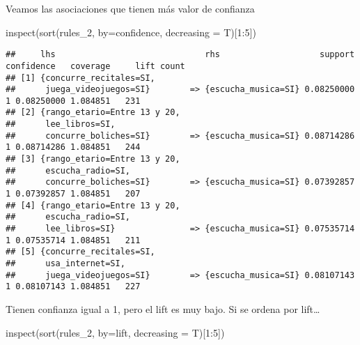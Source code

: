 \documentclass[
]{article}
\newenvironment{Shaded}{\begin{snugshade}}{\end{snugshade}}
\newcommand{\AttributeTok}[1]{\textcolor[rgb]{0.77,0.63,0.00}{#1}}
\newcommand{\DecValTok}[1]{\textcolor[rgb]{0.00,0.00,0.81}{#1}}
\newcommand{\FunctionTok}[1]{\textcolor[rgb]{0.00,0.00,0.00}{#1}}
\newcommand{\NormalTok}[1]{#1}
\newcommand{\SpecialCharTok}[1]{\textcolor[rgb]{0.00,0.00,0.00}{#1}}
\newcommand{\StringTok}[1]{\textcolor[rgb]{0.31,0.60,0.02}{#1}}
\begin{document}
Veamos las asociaciones que tienen más valor de confianza

\begin{Shaded}
\begin{Highlighting}[]
\FunctionTok{inspect}\NormalTok{(}\FunctionTok{sort}\NormalTok{(rules\_2, }\AttributeTok{by=}\StringTok{\textquotesingle{}confidence\textquotesingle{}}\NormalTok{, }\AttributeTok{decreasing =}\NormalTok{ T)[}\DecValTok{1}\SpecialCharTok{:}\DecValTok{5}\NormalTok{])}
\end{Highlighting}
\end{Shaded}

\begin{verbatim}
##     lhs                              rhs                    support confidence   coverage     lift count
## [1] {concurre_recitales=SI,                                                                             
##      juega_videojuegos=SI}        => {escucha_musica=SI} 0.08250000          1 0.08250000 1.084851   231
## [2] {rango_etario=Entre 13 y 20,                                                                        
##      lee_libros=SI,                                                                                     
##      concurre_boliches=SI}        => {escucha_musica=SI} 0.08714286          1 0.08714286 1.084851   244
## [3] {rango_etario=Entre 13 y 20,                                                                        
##      escucha_radio=SI,                                                                                  
##      concurre_boliches=SI}        => {escucha_musica=SI} 0.07392857          1 0.07392857 1.084851   207
## [4] {rango_etario=Entre 13 y 20,                                                                        
##      escucha_radio=SI,                                                                                  
##      lee_libros=SI}               => {escucha_musica=SI} 0.07535714          1 0.07535714 1.084851   211
## [5] {concurre_recitales=SI,                                                                             
##      usa_internet=SI,                                                                                   
##      juega_videojuegos=SI}        => {escucha_musica=SI} 0.08107143          1 0.08107143 1.084851   227
\end{verbatim}

Tienen confianza igual a 1, pero el lift es muy bajo. Si se ordena por
lift\ldots{}

\begin{Shaded}
\begin{Highlighting}[]
\FunctionTok{inspect}\NormalTok{(}\FunctionTok{sort}\NormalTok{(rules\_2, }\AttributeTok{by=}\StringTok{\textquotesingle{}lift\textquotesingle{}}\NormalTok{, }\AttributeTok{decreasing =}\NormalTok{ T)[}\DecValTok{1}\SpecialCharTok{:}\DecValTok{5}\NormalTok{])}
\end{Highlighting}
\end{Shaded}
\end{document}
